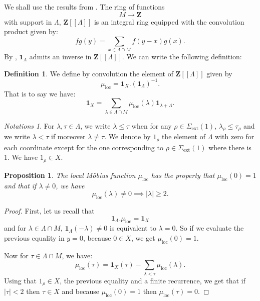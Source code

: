 \documentclass{proc-l}
\newcommand{\Z}{\mathbf{Z}}
\DeclareMathOperator{\loc}{loc}
\DeclareMathOperator{\ext}{ext}
\newtheorem{prop}[theorem]{Proposition}
\theoremstyle{definition}
\newtheorem{definition}[theorem]{Definition}
\theoremstyle{remark}
\newtheorem{Notations}[theorem]{Notations}
\numberwithin{equation}{section}
\begin{document}
We shall use the results from \cite[section 3.3]{methode_du_cercle_peyre}. The ring of functions $$M \rightarrow \Z$$ with support in $\Lambda$, $\Z [[\Lambda]]$ is an integral ring equipped with the convolution product given by:
$$fg(y) = \sum\limits_{x \in \Lambda \cap M} f(y-x) g(x) .$$By \cite[lemma 3.3.8]{methode_du_cercle_peyre}, $\mathbf{1}_\Lambda$ admits an inverse in $\Z [[\Lambda]]$. We can write the following definition:

\begin{definition}
    We define by convolution the element of $\Z [[\Lambda]]$ given by $$\mu_{\loc} = \mathbf{1}_X . ( \mathbf{1}_\Lambda )^{-1} .$$That is to say we have: $$ \mathbf{1}_X = \sum\limits_{\lambda \in \Lambda \cap M} \mu_{\loc}(\lambda) \mathbf{1}_{\lambda + \Lambda} .$$
\end{definition}

\begin{Notations}
    For $\lambda, \tau \in \Lambda$, we write $\lambda \leqslant \tau$ when for any $\rho \in \Sigma_{\ext}(1)$, $\lambda_{\rho} \leqslant \tau_{\rho}$ and we write $\lambda < \tau$ if moreover $\lambda \neq \tau$. We denote by $1_{\rho}$ the element of $\Lambda$ with zero for each coordinate except for the one corresponding to $\rho \in \Sigma_{\ext}(1)$ where there is 1. We have $1_{\rho} \in X$.
\end{Notations}

\begin{prop}\label{proposition_local_mobius_prop_one}
    The local Möbius function $\mu_{\loc}$ has the property that $\mu_{\loc}(0) = 1 $ and that if $\lambda \neq 0$, we have $$\mu_{\loc}(\lambda) \neq 0 \implies |\lambda| \geqslant 2 .$$
\end{prop}

\begin{proof}
    First, let us recall that $$\mathbf{1}_{\Lambda} . \mu_{\loc} = \mathbf{1}_X$$ and for $\lambda \in \Lambda \cap M$,  $\mathbf{1}_{\Lambda}(-\lambda) \neq 0 $ is equivalent to $\lambda = 0$. So if we evaluate the previous equality in $y = 0$, because $0 \in X$, we get $\mu_{\loc}(0) = 1 $.

    Now for $\tau \in \Lambda \cap M$, we have:
    $$\mu_{\loc}(\tau) = \mathbf{1}_X(\tau) - \sum\limits_{\lambda < \tau} \mu_{\loc}(\lambda) . $$Using that $1_{\rho} \in X$, the previous equality and a finite recurrence, we get that if $|\tau| < 2$ then $\tau \in X$ and because $\mu_{\loc}(0) = 1$ then $\mu_{\loc}(\tau) = 0$.
\end{proof}
\end{document}
